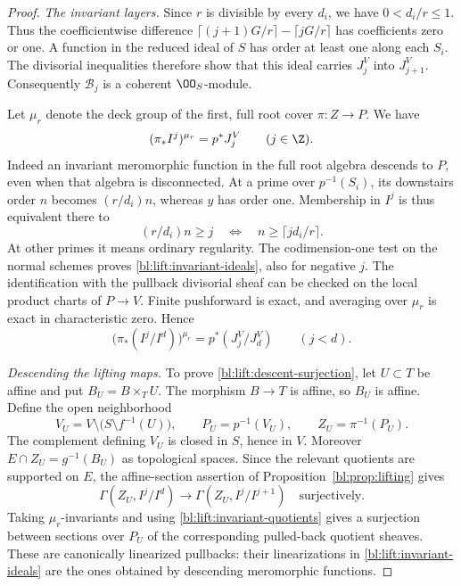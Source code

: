 \begin{proof}
\emph{The invariant layers.}
Since \(r\) is divisible by every \(d_i\), we have \(0<d_i/r\leq1\).
Thus the coefficientwise difference
\(\lceil(j+1)G/r\rceil-\lceil jG/r\rceil\) has coefficients zero
or one.  A function in the reduced ideal of \(S\) has order at least
one along each \(S_i\).  The divisorial inequalities therefore show
that this ideal carries \(J_j^V\) into \(J_{j+1}^V\).
Consequently \(\mathcal B_j\) is a coherent \(\OO_S\)-module.

Let \(\mu_r\) denote the deck group of the first, full root cover
\(\pi:Z\to P\).  We have
\begin{equation}\label{bl:lift:invariant-ideals}
 (\pi_*I^j)^{\mu_r}=p^*J_j^V
 \qquad (j\in\Z).
\end{equation}
Indeed an invariant meromorphic function in the full root algebra
descends to \(P\), even when that algebra is disconnected.
At a prime over \(p^{-1}(S_i)\), its downstairs order \(n\) becomes
\((r/d_i)n\), whereas \(y\) has order one.  Membership in \(I^j\)
is thus equivalent there to
\[
 (r/d_i)n\geq j
 \quad\Longleftrightarrow\quad n\geq\lceil jd_i/r\rceil.
\]
At other primes it means ordinary regularity.  The codimension-one
test on the normal schemes proves \eqref{bl:lift:invariant-ideals}, also
for negative \(j\).  The identification with the pullback divisorial
sheaf can be checked on the local product charts of \(P\to V\).
Finite pushforward is exact, and averaging over \(\mu_r\) is exact
in characteristic zero.  Hence
\begin{equation}\label{bl:lift:invariant-quotients}
 \bigl(\pi_*(I^j/I^d)\bigr)^{\mu_r}
   =p^*(J_j^V/J_d^V) \qquad(j<d).
\end{equation}

\smallskip\noindent
\emph{Descending the lifting maps.}
To prove \eqref{bl:lift:descent-surjection}, let \(U\subset T\) be
affine and put \(B_U=B\times_T U\).  The morphism \(B\to T\) is
affine, so \(B_U\) is affine.  Define the open neighborhood
\[
 V_U=V\setminus\bigl(S\setminus f^{-1}(U)\bigr),\qquad
 P_U=p^{-1}(V_U),\qquad Z_U=\pi^{-1}(P_U).
\]
The complement defining \(V_U\) is closed in \(S\), hence in \(V\).
Moreover \(E\cap Z_U=g^{-1}(B_U)\) as topological spaces.
Since the relevant quotients are supported on \(E\), the
affine-section assertion of Proposition~\ref{bl:prop:lifting} gives
\[
 \Gamma(Z_U,I^j/I^d)\longrightarrow
 \Gamma(Z_U,I^j/I^{j+1})
 \quad\text{surjectively}.
\]
Taking \(\mu_r\)-invariants and using
\eqref{bl:lift:invariant-quotients} gives a surjection between sections
over \(P_U\) of the corresponding pulled-back quotient sheaves.
These are canonically linearized pullbacks: their linearizations in
\eqref{bl:lift:invariant-ideals} are the ones obtained by descending
meromorphic functions.


\end{proof}
